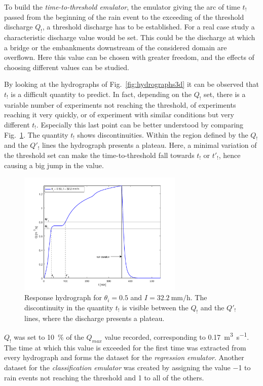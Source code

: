 To build the \emph{time-to-threshold emulator}, the emulator giving the arc of time $t_!$ passed from the beginning of the rain event to the exceeding of the threshold discharge $Q_!$, a threshold discharge has to be established.
For a real case study a characteristic discharge value would be set.
This could be the discharge at which a bridge or the embankments downstream of the considered domain are overflown.
Here this value can be chosen with greater freedom, and the effects of choosing different values can be studied.

By looking at the hydrographs of Fig.~\ref{fig:hydrographs3d} it can be observed that $t_!$ is a difficult quantity to predict.
In fact, depending on the $Q_!$ set, there is a variable number of experiments not reaching the threshold, of experiments reaching it very quickly, or of experiment with similar conditions but very different $t_!$.
Especially this last point can be better understood by comparing Fig.~\ref{fig:hydrograph}.
The quantity $t_!$ shows discontinuities.
Within the region defined by the $Q_!$ and the $Q'_!$ lines the hydrograph presents a plateau.
Here, a minimal variation of the threshold set can make the time-to-threshold fall towards $t_!$ or $t'_!$, hence causing a big jump in the value.

\begin{figure}[h]
  \centering
  \includegraphics[width=0.7\textwidth]{Figures/hydrograph.png}
  \caption{Response hydrograph for $\theta_i = \num{0.5}$ and $I = \SI{32.2}{\milli\meter\per\hour}$. The discontinuity in the quantity $t_!$ is visible between the $Q_!$ and the $Q'_!$ lines, where the discharge presents a plateau.}
  \label{fig:hydrograph}
\end{figure}

$Q_!$ was set to \SI{10}{\percent}  of the $Q_{max}$ value recorded, corresponding to \SI{0.17}{\cubic\meter\per\second}.
The time at which this value is exceeded for the first time was extracted from every hydrograph and forms the dataset for the \emph{regression emulator}.
Another dataset for the \emph{classification emulator} was created by assigning the value \num{-1} to rain events not reaching the threshold and \num{1} to all of the others.

